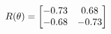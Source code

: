 \documentclass[preview]{standalone}
\begin{document}
\begin{align*}
\special{dvisvgm:raw <g id='unique000'>}R(\theta) = \begin{bmatrix}-0.73 & 0.68\\-0.68 & -0.73\end{bmatrix}\special{dvisvgm:raw </g>}
\end{align*}
\end{document}
